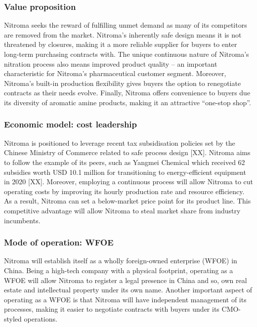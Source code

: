 \subsubsection{Value proposition}
Nitroma seeks the reward of fulfilling unmet demand as many of its competitors are removed from the market. Nitroma’s inherently safe design means it is not threatened by closures, making it a more reliable supplier for buyers to enter long-term purchasing contracts with. The unique continuous nature of Nitroma’s nitration process also means improved product quality – an important characteristic for Nitroma’s pharmaceutical customer segment. Moreover, Nitroma’s built-in production flexibility gives buyers the option to renegotiate contracts as their needs evolve. Finally, Nitroma offers convenience to buyers due its diversity of aromatic amine products, making it an attractive “one-stop shop”.
\subsubsection{Economic model: cost leadership}
Nitroma is positioned to leverage recent tax subsidisation policies set by the Chinese Ministry of Commerce related to safe process design [XX]. Nitroma aims to follow the example of its peers, such as Yangmei Chemical which received 62 subsidies worth USD 10.1 million for transitioning to energy-efficient equipment in 2020 [XX]. Moreover, employing a continuous process will allow Nitroma to cut operating costs by improving its hourly production rate and resource efficiency. As a result, Nitroma can set a below-market price point for its product line. This competitive advantage will allow Nitroma to steal market share from industry incumbents. 
\subsubsection{Mode of operation: WFOE}
Nitroma will establish itself as a wholly foreign-owned enterprise (WFOE) in China. Being a high-tech company with a physical footprint, operating as a WFOE will allow Nitroma to register a legal presence in China and so, own real estate and intellectual property under its own name. Another important aspect of operating as a WFOE is that Nitroma will have independent management of its processes, making it easier to negotiate contracts with buyers under its CMO-styled operations.

